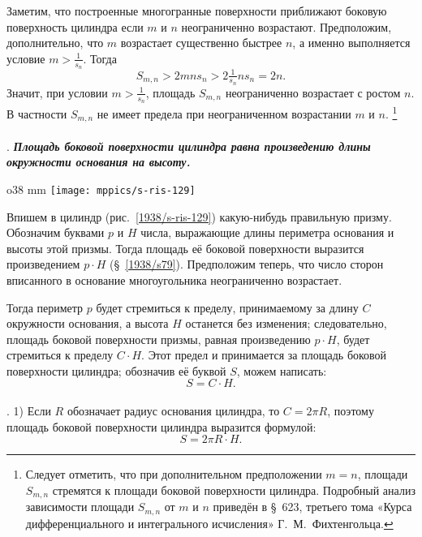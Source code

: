 {Заметим, что построенные многогранные поверхности приближают боковую поверхность цилиндра если $m$ и $n$ неограниченно возрастают.
Предположим, дополнительно, что $m$ возрастает существенно быстрее $n$,
а именно выполняется условие $m>\tfrac1{s_n}$.
Тогда
\[S_{m,n}> 2 m n s_n>2 \tfrac1{s_n} n s_n=2n.\]
Значит, при условии $m>\tfrac1{s_n}$, площадь $S_{m,n}$ неограниченно возрастает с ростом $n$.
В частности $S_{m,n}$ не имеет предела при неограниченном возрастании $m$ и $n$.%
\footnote{Следует отметить, что при дополнительном предположении $m=n$, площади $S_{m,n}$ стремятся к площади боковой поверхности цилиндра. Подробный анализ зависимости площади $S_{m,n}$ от $m$ и $n$ приведён в §~623, третьего тома  «Курса дифференциального и интегрального исчисления» Г.~М.~Фихтенгольца.}

}

\paragraph{}\label{1938/s112}
.
\textbf{\emph{Площадь боковой поверхности цилиндра равна произведению длины окружности основания на высоту.}}

\begin{wrapfigure}{o}{38 mm}
\vskip-0mm
\centering
\texttt{[image: mppics/s-ris-129]}
\caption{}\label{1938/s-ris-129}
\vskip4mm
\end{wrapfigure}

Впишем в цилиндр (рис.~\ref{1938/s-ris-129}) какую-нибудь правильную призму.
Обозначим буквами $p$ и $H$ числа, выражающие длины периметра основания и высоты этой призмы.
Тогда площадь её боковой поверхности выразится произведением $p\cdot H$ (§~\ref{1938/s79}).
Предположим теперь, что число сторон вписанного в основание многоугольника неограниченно возрастает.


Тогда периметр $p$ будет стремиться к пределу, принимаемому за длину $C$ окружности основания, а высота $H$ останется без изменения;
следовательно, площадь боковой поверхности призмы, равная произведению $p\cdot H$, будет стремиться к пределу $C\cdot H$.
Этот предел и принимается за площадь боковой поверхности цилиндра;
обозначив её буквой $S$, можем написать:
\[S = C\cdot H.\]

\paragraph{}\label{1938/s113}
\mbox{.}
1) Если $R$ обозначает радиус основания цилиндра, то $C= 2\pi R$, поэтому площадь боковой поверхности цилиндра выразится формулой:
\[S = 2\pi R \cdot H.\]

